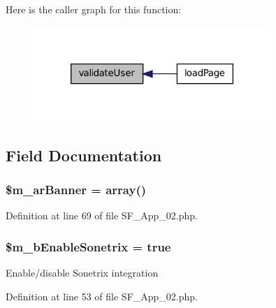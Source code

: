 Here is the caller graph for this function:\nopagebreak
\begin{figure}[H]
\begin{center}
\leavevmode
\includegraphics[width=254pt]{classSF__App__02_a18a992b92ee5ff3ad60ec30d8e0cba60_icgraph}
\end{center}
\end{figure}




\subsection{Field Documentation}
\hypertarget{classSF__App__02_a03606a66e78d358c6094f05f0857845d}{
\subsubsection[{\$m\_\-arBanner}]{\setlength{\rightskip}{0pt plus 5cm}\$m\_\-arBanner = {\bf array}()}}
\label{classSF__App__02_a03606a66e78d358c6094f05f0857845d}


Definition at line 69 of file SF\_\-App\_\-02.php.

\hypertarget{classSF__App__02_a55534a049a693ced372dba4331e5e9bd}{
\subsubsection[{\$m\_\-bEnableSonetrix}]{\setlength{\rightskip}{0pt plus 5cm}\$m\_\-bEnableSonetrix = true}}
\label{classSF__App__02_a55534a049a693ced372dba4331e5e9bd}
Enable/disable Sonetrix integration 

Definition at line 53 of file SF\_\-App\_\-02.php.

